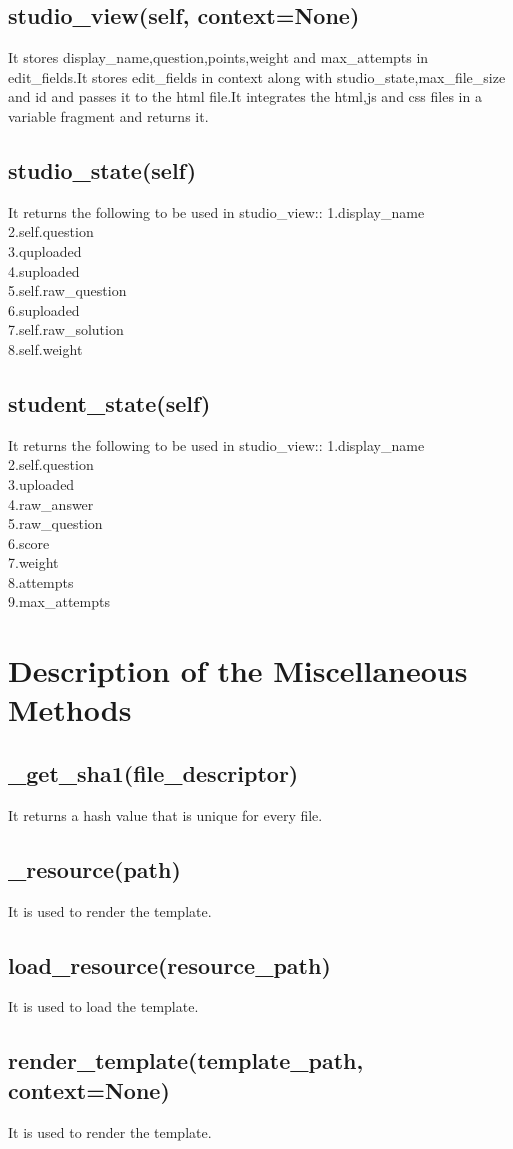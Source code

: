 \documentclass{scrreprt}
\begin{document}
\subsection{studio_view(self, context=None)}

It stores display_name,question,points,weight and max_attempts in edit_fields.It stores edit_fields in context along with 
studio_state,max_file_size and id and passes it to the html file.It integrates
the html,js and css files in a variable fragment and returns it.

\subsection{studio_state(self)}
It returns the following to be used in studio_view::
1.display_name\\
2.self.question\\
3.quploaded\\
4.suploaded\\
5.self.raw_question\\
6.suploaded\\
7.self.raw_solution\\
8.self.weight

\subsection{student_state(self)}
It returns the following to be used in studio_view::
1.display_name\\
2.self.question\\
3.uploaded\\
4.raw_answer\\
5.raw_question\\
6.score\\
7.weight\\
8.attempts\\
9.max_attempts


\section{Description of the Miscellaneous Methods}


\subsection{_get_sha1(file_descriptor)}
It returns a hash value that is unique for every file.

\subsection{_resource(path)}
It is used to render the template. 

\subsection{load_resource(resource_path)}
It is used to load the template.

\subsection{render_template(template_path, context=None)}
It is used to render the template.
\end{document}
